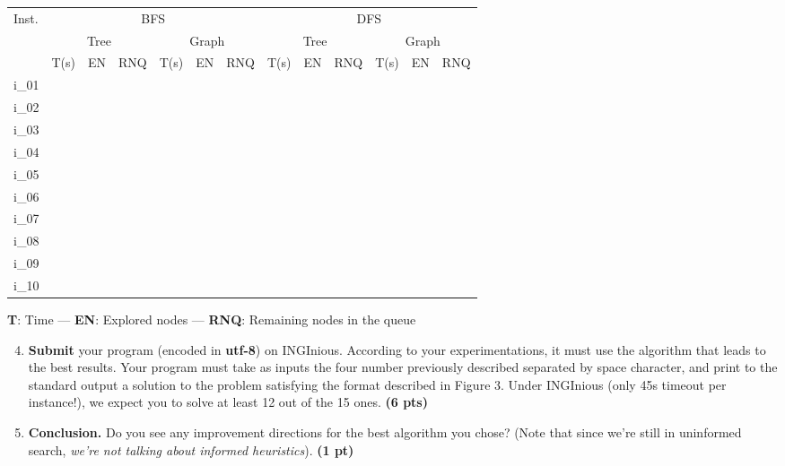 \documentclass[11pt,a4paper]{report}
\begin{document}
\begin{answers}[7cm]
\small
\begin{center}
\begin{tabular}{||l|l|l|l|l|l|l|l|l|l|l|l|l||}
\hline
\multirow{3}{*}{Inst.} & \multicolumn{6}{c|}{BFS} & \multicolumn{6}{c||}{DFS} \\
\cline{2-13}
& \multicolumn{3}{c|}{Tree} & \multicolumn{3}{c|}{Graph} & \multicolumn{3}{c|}{Tree} & \multicolumn{3}{c||}{Graph}\\
\cline{2-13}
 & T(s) & EN & RNQ & T(s) & EN & RNQ & T(s) & EN & RNQ & T(s) & EN & RNQ\\
\hline
i\_01 & & & & & & & & & & & & \\
\hline
i\_02 & & & & & & & & & & & & \\
\hline
i\_03 & & & & & & & & & & & & \\
\hline
i\_04 & & & & & & & & & & & & \\
\hline
i\_05 & & & & & & & & & & & & \\
\hline
i\_06 & & & & & & & & & & & & \\
\hline
i\_07 & & & & & & & & & & & & \\
\hline
i\_08 & & & & & & & & & & & & \\
\hline
i\_09 & & & & & & & & & & & & \\
\hline
i\_10 & & & & & & & & & & & & \\
\hline
\end{tabular}
\end{center}
\textbf{T}: Time — \textbf{EN}: Explored nodes —
\textbf{RNQ}: Remaining nodes in the queue
\end{answers}



\begin{enumerate}
\setcounter{enumi}{3}
    \item \textbf{Submit} your program (encoded in \textbf{utf-8}) on INGInious. According to your experimentations, it must use the algorithm that leads to the best results. Your program must take as inputs the four number previously described separated by space character, and print to the standard output a solution to the problem satisfying the format described in Figure 3. Under INGInious (only 45s timeout per instance!), we expect you to solve at least 12 out of the 15 ones. \textbf{(6 pts)}
\end{enumerate}

\begin{enumerate}
\setcounter{enumi}{4}
    \item \textbf{Conclusion.} Do you see any improvement directions for the best algorithm you chose? (Note that since we're still in uninformed search, \textit{we're not talking about informed heuristics}). \textbf{(1 pt)}
\end{enumerate}

\begin{answer}
\end{answer}
\end{document}
